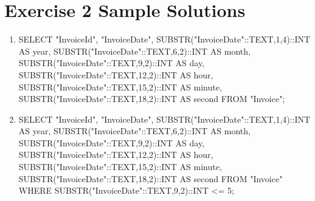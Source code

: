 \documentclass[USenglish,final,authoryear,12pt]{article}
\begin{document}
\section{Exercise 2 Sample Solutions}
\begin{enumerate}
	\item SELECT "InvoiceId",\newline
	"InvoiceDate",\newline
	SUBSTR("InvoiceDate"::TEXT,1,4)::INT AS year,\newline
	SUBSTR("InvoiceDate"::TEXT,6,2)::INT AS month,\newline
	SUBSTR("InvoiceDate"::TEXT,9,2)::INT AS day,\newline
	SUBSTR("InvoiceDate"::TEXT,12,2)::INT AS hour,\newline
	SUBSTR("InvoiceDate"::TEXT,15,2)::INT AS minute,\newline
	SUBSTR("InvoiceDate"::TEXT,18,2)::INT AS second\newline
	FROM "Invoice";\newline
	\item SELECT "InvoiceId",\newline
	"InvoiceDate",\newline
	SUBSTR("InvoiceDate"::TEXT,1,4)::INT AS year,\newline
	SUBSTR("InvoiceDate"::TEXT,6,2)::INT AS month,\newline
	SUBSTR("InvoiceDate"::TEXT,9,2)::INT AS day,\newline
	SUBSTR("InvoiceDate"::TEXT,12,2)::INT AS hour,\newline
	SUBSTR("InvoiceDate"::TEXT,15,2)::INT AS minute,\newline
	SUBSTR("InvoiceDate"::TEXT,18,2)::INT AS second\newline
	FROM "Invoice"\newline
	WHERE SUBSTR("InvoiceDate"::TEXT,9,2)::INT <= 5;
\end{enumerate}
\end{document}
